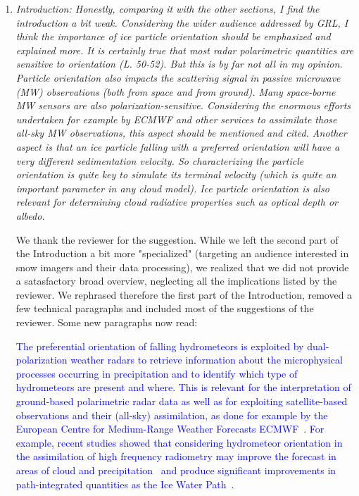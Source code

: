 \documentclass[12pt]{article}
\newcommand*{\blue}{\textcolor{blue}}
\begin{document}
\begin{enumerate}
    \item \textit{Introduction: Honestly, comparing it with the other sections, I find the introduction a bit weak. Considering the wider audience addressed by GRL, I think the importance of ice particle orientation should be emphasized and explained more. It is certainly true that most radar polarimetric quantities are sensitive to orientation (L. 50-52). But this is by far not all in my opinion. Particle orientation also impacts the scattering signal in passive microwave (MW) observations (both from space and from ground). Many space-borne MW sensors are also polarization-sensitive. Considering the enormous efforts undertaken for example by ECMWF and other services to assimilate those all-sky MW observations, this aspect should be mentioned and cited. Another aspect is that an ice particle falling with a preferred orientation will have a very different sedimentation velocity. So characterizing the particle orientation is quite key to simulate its terminal velocity (which is quite an important parameter in any cloud model). Ice particle orientation is also relevant for determining cloud radiative properties such as optical depth or albedo.}
    
    We thank the reviewer for the suggestion. While we left the second part of the Introduction a bit more "specialized" (targeting an audience interested in snow imagers and their data processing), we realized that we did not provide a satasfactory broad overview, neglecting all the implications listed by the reviewer. We rephrased therefore the first part of the Introduction, removed a few technical paragraphs and included most of the suggestions of the reviewer. Some new paragraphs now read:
    
    \blue{The preferential orientation of falling hydrometeors is exploited by dual-polarization weather radars to retrieve information about the microphysical processes occurring in precipitation and to identify which type of hydrometeors are present and where. This is relevant for the interpretation of ground-based polarimetric radar data as well as for exploiting satellite-based observations and their (all-sky) assimilation, as done for example by the European Centre for Medium-Range Weather Forecasts ECMWF~\cite{Eyre_QJRMS_2022}. For example, recent studies showed that considering hydrometeor orientation in the assimilation of high frequency radiometry may improve the  forecast in areas of cloud and precipitation~\cite{Barlakas_AMT_2021} and produce significant improvements in path-integrated quantities as the Ice Water Path~\cite{Kaur_RS_2022}.}


\end{enumerate}
\end{document}
